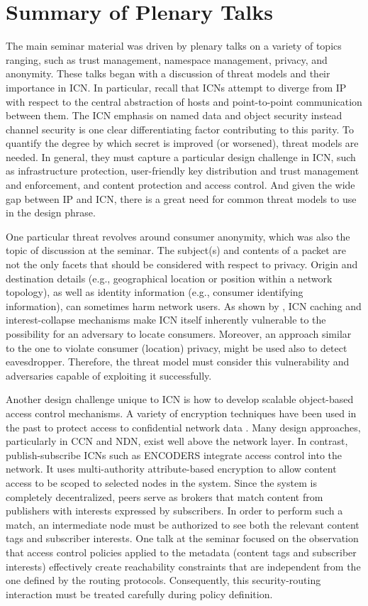 \section{Summary of Plenary Talks} \label{sec:plenary-talks}
The main seminar material was driven by plenary talks on a variety of topics
ranging, such as trust management, namespace management, privacy, and anonymity.
These talks began with a discussion of threat models and their importance in ICN.
In particular, recall that ICNs attempt to diverge from IP with respect
to the central abstraction of hosts and point-to-point communication between
them. The ICN emphasis on named data and object security instead channel security
is one clear differentiating factor contributing to this parity. To quantify
the degree by which secret is improved (or worsened), threat models are needed.
In general, they must capture a particular design challenge in ICN, such as
infrastructure protection, user-friendly key distribution and trust management
and enforcement, and content protection and access control. And given the wide gap
between IP and ICN, there is a great need for common threat models to use
in the design phrase.

One particular threat revolves around consumer anonymity, which was also
the topic of discussion at the seminar. The subject(s) and contents
of a packet are not the only facets that should be considered with respect to privacy.
Origin and destination details (e.g., geographical location or position within a network
topology), as well as identity information (e.g., consumer identifying information),
can sometimes harm network users. As shown by \cite{compagno2015violating}, ICN caching and interest-collapse mechanisms make
ICN itself inherently vulnerable to the possibility for an adversary to locate
consumers. Moreover, an approach similar to the one to violate consumer
(location) privacy, might be used also to detect eavesdropper. Therefore, the
threat model must consider this vulnerability and adversaries capable of exploiting
it successfully.

Another design challenge unique to ICN is how to develop scalable object-based
access control mechanisms. A variety of encryption techniques have been used
in the past to protect access to confidential network data \cite{tourani2016security}.
Many design approaches, particularly in CCN and NDN, exist well above the network
layer. In contrast, publish-subscribe ICNs such as ENCODERS \cite{raykova2015decentralized} integrate
access control into the network. It uses multi-authority attribute-based encryption
to allow content access to be scoped to selected nodes in the system. Since the
system is completely decentralized, peers serve as brokers that match content from
publishers with interests expressed by subscribers. In order to perform such a match,
an intermediate node must be authorized to see both the relevant content tags and
subscriber interests. One talk at the seminar focused on the observation that
access control policies applied to the metadata (content tags and subscriber interests)
effectively create reachability constraints that are independent from the one defined by
the routing protocols. Consequently, this security-routing interaction must be
treated carefully during policy definition.

